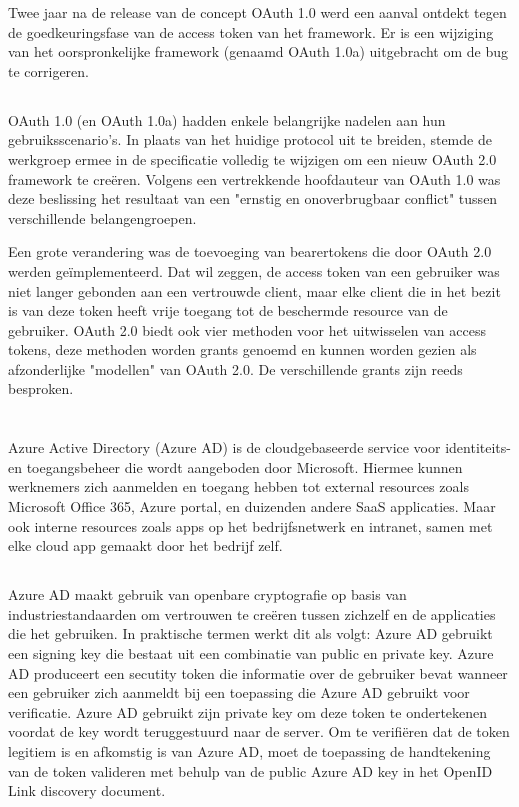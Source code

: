 Twee jaar na de release van de concept OAuth 1.0 werd een aanval ontdekt tegen de goedkeuringsfase van de access token van het framework. Er is een wijziging van het oorspronkelijke framework (genaamd OAuth 1.0a) uitgebracht om de bug te corrigeren.
\subsection{}
OAuth 1.0 (en OAuth 1.0a) hadden enkele belangrijke nadelen aan hun gebruiksscenario's. In plaats van het huidige protocol uit te breiden, stemde de werkgroep ermee in de specificatie volledig te wijzigen om een nieuw OAuth 2.0 framework te creëren. Volgens een vertrekkende hoofdauteur van OAuth 1.0 was deze beslissing het resultaat van een "ernstig en onoverbrugbaar conflict" tussen verschillende belangengroepen.

Een grote verandering was de toevoeging van bearertokens die door OAuth 2.0 werden geïmplementeerd. Dat wil zeggen, de access token van een gebruiker was niet langer gebonden aan een vertrouwde client, maar elke client die in het bezit is van deze token heeft vrije toegang tot de beschermde resource van de gebruiker. OAuth 2.0 biedt ook vier methoden voor het uitwisselen van access tokens, deze methoden worden grants genoemd en kunnen worden gezien als afzonderlijke "modellen" van OAuth 2.0. De verschillende grants zijn reeds besproken.
\section{}
\label{sec:AzureRollingKeys}
Azure Active Directory (Azure AD) is de cloudgebaseerde service voor identiteits- en toegangsbeheer die wordt aangeboden door Microsoft. Hiermee kunnen werknemers zich aanmelden en toegang hebben tot external resources zoals Microsoft Office 365, Azure portal, en duizenden andere SaaS applicaties. Maar ook interne resources zoals apps op het bedrijfsnetwerk en intranet, samen met elke cloud app gemaakt door het bedrijf zelf.
\subsection{}
Azure AD maakt gebruik van openbare cryptografie op basis van industriestandaarden om vertrouwen te creëren tussen zichzelf en de applicaties die het gebruiken. In praktische termen werkt dit als volgt: Azure AD gebruikt een signing key die bestaat uit een combinatie van public en private key. Azure AD produceert een secutity token die informatie over de gebruiker bevat wanneer een gebruiker zich aanmeldt bij een toepassing die Azure AD gebruikt voor verificatie. Azure AD gebruikt zijn private key om deze token te ondertekenen voordat de key wordt teruggestuurd naar de server. Om te verifiëren dat de token legitiem is en afkomstig is van Azure AD, moet de toepassing de handtekening van de token valideren met behulp van de public Azure AD key in het OpenID Link discovery document.

